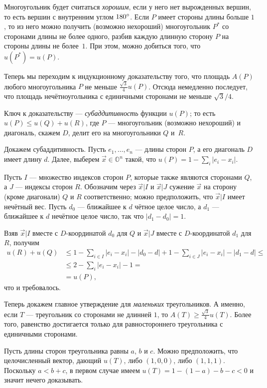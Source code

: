 Многоугольник будет считаться \emph{хорошим}, если у него нет вырожденных вершин,
то есть вершин с внутренним углом $180\degree$.
Если $P$ имеет стороны длины больше $1$, то из него можно получить (возможно нехороший) многоугольник $P^*$ со сторонами длины не более одного, разбив каждую длинную сторону $P$ на стороны длины не более~$1$.
При этом, можно добиться того, что $u(P^*)=u(P)$.

Теперь мы переходим к индукционному доказательству того, что площадь $A(P)$ любого многоугольника $P$ не меньше $\tfrac{\sqrt{3}}{4}u(P)$.
Отсюда немедленно последует, что площадь нечётноугольника с единичными сторонами не меньше  $\sqrt{3}/4$.

Ключ к доказательству --- \emph{субаддитивность} функции $u(P)$;
то есть $u(P)\leqslant u(Q)+u(R)$, где $P$ --- многоугольник (возможно нехороший) и диагональ, скажем $D$, делит его на многоугольники $Q$ и~$R$.

Докажем субаддитивность.
Пусть  $e_1,\dots,e_n$ --- длины сторон $P$, а его диагональ $D$ имеет длину $d$. 
Далее, выберем $\vec x\in\mathbb{O}^n$ такой, что $u(P)=1-\sum_i |e_i-x_i|$.

Пусть $I$ --- множество индексов сторон $P$, которые также являются сторонами $Q$, а $J$ --- индексы сторон $R$.
Обозначим через $\vec x|I$ и $\vec x|J$ сужение $\vec x$ на сторону (кроме диагонали) $Q$ и $R$ соответственно;
можно предположить, что $\vec x|I$ имеет нечётный вес.
Пусть $d_0$ --- ближайшее к $d$ чётное целое число, а $d_1$ --- ближайшее к $d$ нечётное целое число, так что $|d_1-d_0|=1$.

Взяв $\vec x|I$ вместе с $D$-координатой $d_0$ для $Q$ и 
$\vec x|J$ вместе с $D$-координатой $d_1$ для $R$, получим
\begin{align*}
u(R)+u(Q)
&\leqslant
1-\sum_{i\in I}|e_i-x_i|-|d_0-d|
+
1-\sum_{i\in J}|e_i-x_i|-|d_1-d|
\leqslant
\\
&\leqslant2-\sum_{i}|e_i-x_i|-1=
\\
&=u(P),
\end{align*}
что и требовалось.

Теперь докажем главное утверждение для \emph{маленьких} треугольников.
А именно, если $T$ --- треугольник со сторонами не длинней $1$, то 
$A(T)\geqslant \tfrac{\sqrt{3}}{4}u(T)$.
Более того, равенство достигается только для равностороннего треугольника с единичными сторонами.

Пусть длины сторон треугольника равны $a$, $b$ и $c$.
Можно предположить, что целочисленный вектор, дающий $u(T)$, либо $(1, 0, 0)$, либо $(1, 1, 1)$.
Поскольку $a < b + c$, в первом случае имеем $u(T)=1-(1-a)-b-c<0$ и значит нечего доказывать.

